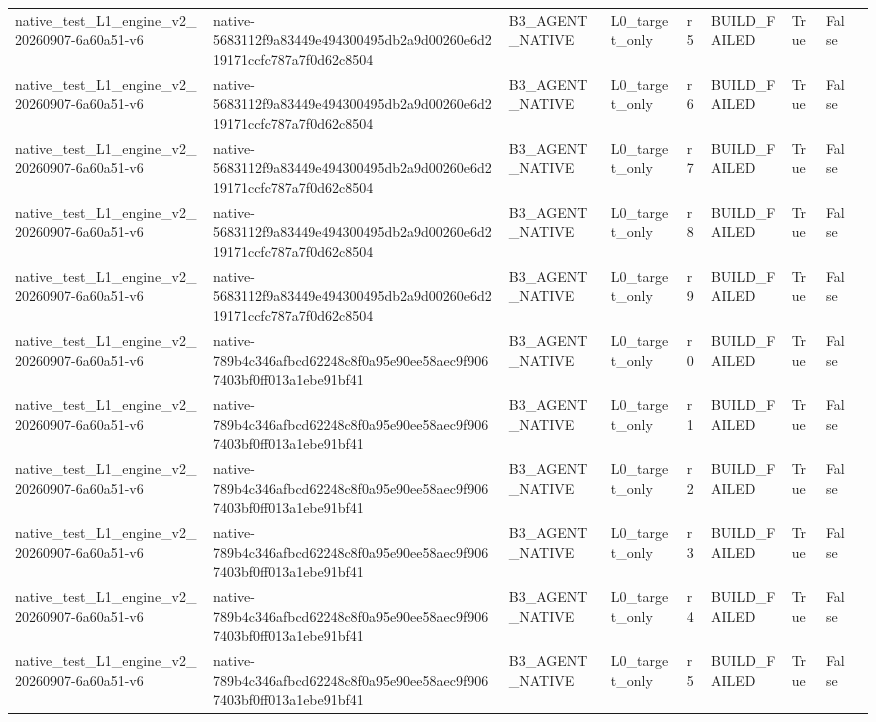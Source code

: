 \begin{tabular}{lllllllll}
native\_test\_L1\_engine\_v2\_20260907-6a60a51-v6 & native-5683112f9a83449e494300495db2a9d00260e6d219171ccfc787a7f0d62c8504 & B3\_AGENT\_NATIVE & L0\_target\_only & r5 & BUILD\_FAILED & True & False &  \\
native\_test\_L1\_engine\_v2\_20260907-6a60a51-v6 & native-5683112f9a83449e494300495db2a9d00260e6d219171ccfc787a7f0d62c8504 & B3\_AGENT\_NATIVE & L0\_target\_only & r6 & BUILD\_FAILED & True & False &  \\
native\_test\_L1\_engine\_v2\_20260907-6a60a51-v6 & native-5683112f9a83449e494300495db2a9d00260e6d219171ccfc787a7f0d62c8504 & B3\_AGENT\_NATIVE & L0\_target\_only & r7 & BUILD\_FAILED & True & False &  \\
native\_test\_L1\_engine\_v2\_20260907-6a60a51-v6 & native-5683112f9a83449e494300495db2a9d00260e6d219171ccfc787a7f0d62c8504 & B3\_AGENT\_NATIVE & L0\_target\_only & r8 & BUILD\_FAILED & True & False &  \\
native\_test\_L1\_engine\_v2\_20260907-6a60a51-v6 & native-5683112f9a83449e494300495db2a9d00260e6d219171ccfc787a7f0d62c8504 & B3\_AGENT\_NATIVE & L0\_target\_only & r9 & BUILD\_FAILED & True & False &  \\
native\_test\_L1\_engine\_v2\_20260907-6a60a51-v6 & native-789b4c346afbcd62248c8f0a95e90ee58aec9f9067403bf0ff013a1ebe91bf41 & B3\_AGENT\_NATIVE & L0\_target\_only & r0 & BUILD\_FAILED & True & False &  \\
native\_test\_L1\_engine\_v2\_20260907-6a60a51-v6 & native-789b4c346afbcd62248c8f0a95e90ee58aec9f9067403bf0ff013a1ebe91bf41 & B3\_AGENT\_NATIVE & L0\_target\_only & r1 & BUILD\_FAILED & True & False &  \\
native\_test\_L1\_engine\_v2\_20260907-6a60a51-v6 & native-789b4c346afbcd62248c8f0a95e90ee58aec9f9067403bf0ff013a1ebe91bf41 & B3\_AGENT\_NATIVE & L0\_target\_only & r2 & BUILD\_FAILED & True & False &  \\
native\_test\_L1\_engine\_v2\_20260907-6a60a51-v6 & native-789b4c346afbcd62248c8f0a95e90ee58aec9f9067403bf0ff013a1ebe91bf41 & B3\_AGENT\_NATIVE & L0\_target\_only & r3 & BUILD\_FAILED & True & False &  \\
native\_test\_L1\_engine\_v2\_20260907-6a60a51-v6 & native-789b4c346afbcd62248c8f0a95e90ee58aec9f9067403bf0ff013a1ebe91bf41 & B3\_AGENT\_NATIVE & L0\_target\_only & r4 & BUILD\_FAILED & True & False &  \\
native\_test\_L1\_engine\_v2\_20260907-6a60a51-v6 & native-789b4c346afbcd62248c8f0a95e90ee58aec9f9067403bf0ff013a1ebe91bf41 & B3\_AGENT\_NATIVE & L0\_target\_only & r5 & BUILD\_FAILED & True & False &  \\

\end{tabular}

